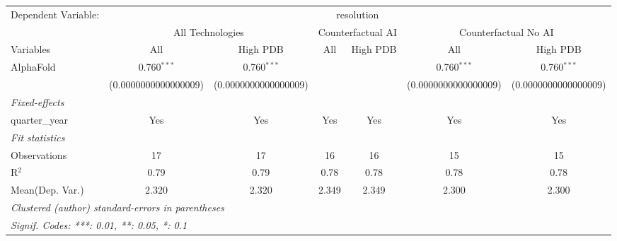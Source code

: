 \begingroup
\centering
\begin{tabular}{lcccccc}
   \tabularnewline \midrule \midrule
   Dependent Variable: & \multicolumn{6}{c}{resolution}\\
 & \multicolumn{2}{c}{All Technologies} & \multicolumn{2}{c}{Counterfactual AI} & \multicolumn{2}{c}{Counterfactual No AI} \\
\cmidrule(lr){1-1}\cmidrule(lr){2-3} \cmidrule(lr){4-5} \cmidrule(lr){6-7}
Variables & \multicolumn{1}{c}{All} & \multicolumn{1}{c}{High PDB} & \multicolumn{1}{c}{All} & \multicolumn{1}{c}{High PDB} & \multicolumn{1}{c}{All} & \multicolumn{1}{c}{High PDB} \\
\cmidrule(lr){1-1}\cmidrule(lr){2-2} \cmidrule(lr){3-3} \cmidrule(lr){4-4} \cmidrule(lr){5-5} \cmidrule(lr){6-6} \cmidrule(lr){7-7}
   AlphaFold      & 0.760$^{***}$        & 0.760$^{***}$        &      &      & 0.760$^{***}$        & 0.760$^{***}$\\   
                  & (0.0000000000000009) & (0.0000000000000009) &      &      & (0.0000000000000009) & (0.0000000000000009)\\   
   \midrule
   \emph{Fixed-effects}\\
   quarter\_year  & Yes                  & Yes                  & Yes  & Yes  & Yes                  & Yes\\  
   \midrule
   \emph{Fit statistics}\\
   Observations   & 17                   & 17                   & 16   & 16   & 15                   & 15\\  
   R$^2$          & 0.79                 & 0.79                 & 0.78 & 0.78 & 0.78                 & 0.78\\  
Mean(Dep. Var.) & 2.320 & 2.320 & 2.349 & 2.349 & 2.300 & 2.300 \\
   \midrule \midrule
   \multicolumn{7}{l}{\emph{Clustered (author) standard-errors in parentheses}}\\
   \multicolumn{7}{l}{\emph{Signif. Codes: ***: 0.01, **: 0.05, *: 0.1}}\\
\end{tabular}
\par\endgroup
